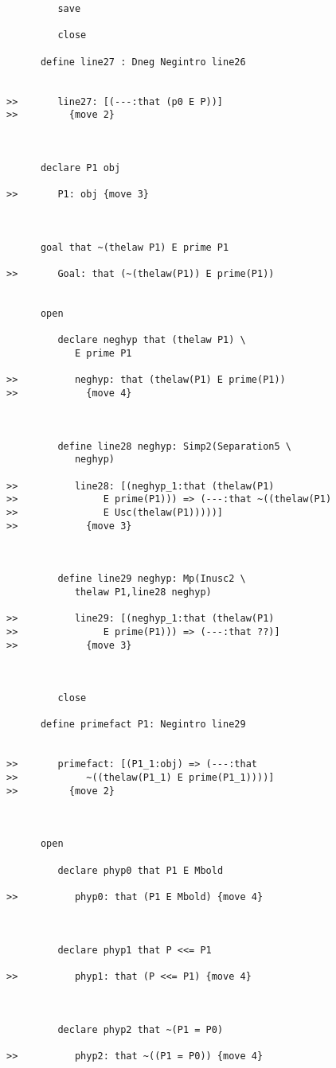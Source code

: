 \documentclass[12pt]{article}
\begin{document}
\begin{verbatim}
         save

         close

      define line27 : Dneg Negintro line26


>>       line27: [(---:that (p0 E P))]
>>         {move 2}



      declare P1 obj

>>       P1: obj {move 3}



      goal that ~(thelaw P1) E prime P1

>>       Goal: that (~(thelaw(P1)) E prime(P1))


      open

         declare neghyp that (thelaw P1) \
            E prime P1

>>          neghyp: that (thelaw(P1) E prime(P1))
>>            {move 4}



         define line28 neghyp: Simp2(Separation5 \
            neghyp)

>>          line28: [(neghyp_1:that (thelaw(P1)
>>               E prime(P1))) => (---:that ~((thelaw(P1)
>>               E Usc(thelaw(P1)))))]
>>            {move 3}



         define line29 neghyp: Mp(Inusc2 \
            thelaw P1,line28 neghyp)

>>          line29: [(neghyp_1:that (thelaw(P1)
>>               E prime(P1))) => (---:that ??)]
>>            {move 3}



         close

      define primefact P1: Negintro line29


>>       primefact: [(P1_1:obj) => (---:that
>>            ~((thelaw(P1_1) E prime(P1_1))))]
>>         {move 2}



      open

         declare phyp0 that P1 E Mbold

>>          phyp0: that (P1 E Mbold) {move 4}



         declare phyp1 that P <<= P1

>>          phyp1: that (P <<= P1) {move 4}



         declare phyp2 that ~(P1 = P0)

>>          phyp2: that ~((P1 = P0)) {move 4}




\end{verbatim}
\end{document}
